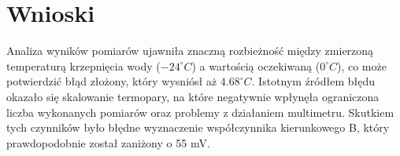 {\section{Wnioski}}

Analiza wyników pomiarów ujawniła znaczną rozbieżność między zmierzoną temperaturą krzepnięcia wody ($-24^{\circ}C$) a wartością oczekiwaną ($0^{\circ}C$), co może potwierdzić błąd złożony, który wysniósł aż $4.68^{\circ}C$. Istotnym źródłem błędu okazało się skalowanie termopary, na które negatywnie wpłynęła ograniczona liczba wykonanych pomiarów oraz problemy z działaniem multimetru. Skutkiem tych czynników było błędne wyznaczenie współczynnika kierunkowego B, który prawdopodobnie został zaniżony o 55 mV.